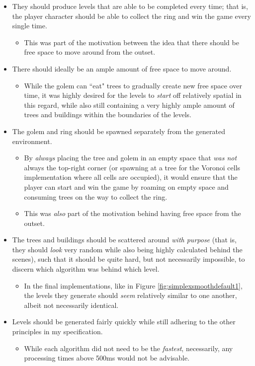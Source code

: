 \begin{itemize}
    \item They should produce levels that are able to be completed every time; that is, the player character should be able to collect the ring and win the game every single time.
    \begin{itemize}
        \item This was part of the motivation between the idea that there should be free space to move around from the outset.
    \end{itemize}
    \item There should ideally be an ample amount of free space to move around.
    \begin{itemize}
        \item While the golem can ``eat" trees to gradually create new free space over time, it was highly desired for the levels to \textit{start} off relatively spatial in this regard, while also still containing a very highly ample amount of trees and buildings within the boundaries of the levels.
    \end{itemize}
    \item The golem and ring should be spawned separately from the generated environment.
    \begin{itemize}
        \item By \textit{always} placing the tree and golem in an empty space that \textit{was not} always the top-right corner (or spawning at a tree for the Voronoi cells implementation where all cells are occupied), it would ensure that the player can start and win the game by roaming on empty space and consuming trees on the way to collect the ring.
        \item This was \textit{also} part of the motivation behind having free space from the outset.
    \end{itemize}
    \item The trees and buildings should be scattered around \textit{with purpose} (that is, they should \textit{look} very random while also being highly calculated behind the scenes), such that it should be quite hard, but not necessarily impossible, to discern which algorithm was behind which level.
    \begin{itemize}
        \item In the final implementations, like in Figure \ref{fig:simplexsmoothdefault1}, the levels they generate should \textit{seem} relatively similar to one another, albeit not necessarily identical.
    \end{itemize}
    \item Levels should be generated fairly quickly while still adhering to the other principles in my specification.
    \begin{itemize}
        \item While each algorithm did not need to be the \textit{fastest}, necessarily, any processing times above 500ms would not be advisable.
    \end{itemize}
\end{itemize}

